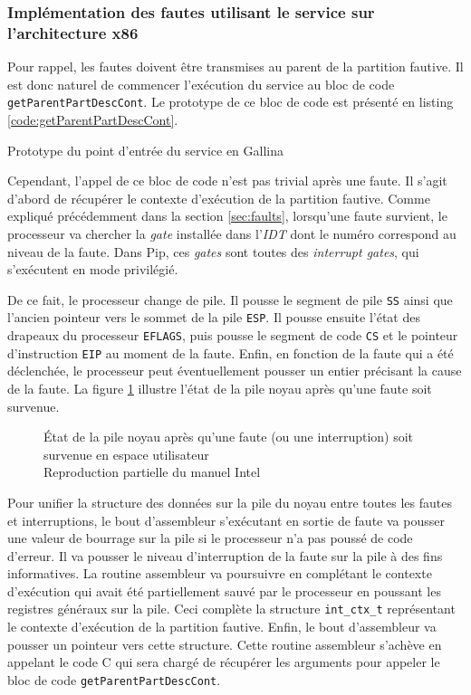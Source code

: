 		\subsubsection{Implémentation des fautes utilisant le service sur l'architecture x86}

		Pour rappel, les fautes doivent être transmises au parent de la partition fautive. Il est donc naturel de commencer l'exécution du service au bloc de code \texttt{getParentPartDescCont}. Le prototype de ce bloc de code est présenté en listing \ref{code:getParentPartDescCont}.

		\begin{listing}[!ht]
			\caption{Prototype du point d'entrée du service en Gallina}
			\label{code:getParentPartDescCont}
		\end{listing}

		Cependant, l'appel de ce bloc de code n'est pas trivial après une faute. Il s'agit d'abord de récupérer le contexte d'exécution de la partition fautive. Comme expliqué précédemment dans la section \ref{sec:faults}, lorsqu'une faute survient, le processeur va chercher la \emph{gate} installée dans l'\emph{IDT} dont le numéro correspond au niveau de la faute. Dans Pip, ces \emph{gates} sont toutes des \emph{interrupt gates}, qui s'exécutent en mode privilégié.

		De ce fait, le processeur change de pile. Il pousse le segment de pile \texttt{SS} ainsi que l'ancien pointeur vers le sommet de la pile \texttt{ESP}. Il pousse ensuite l'état des drapeaux du processeur \texttt{EFLAGS}, puis pousse le segment de code \texttt{CS} et le pointeur d'instruction \texttt{EIP} au moment de la faute. Enfin, en fonction de la faute qui a été déclenchée, le processeur peut éventuellement pousser un entier précisant la cause de la faute. La figure \ref{fig:proc_interrupt_stack} illustre l'état de la pile noyau après qu'une faute soit survenue.

		\begin{figure}[!ht]
			
			\caption{État de la pile noyau après qu'une faute (ou une interruption) soit survenue en espace utilisateur\\Reproduction partielle du manuel Intel \cite{intel_interrupt_stack}}
			\label{fig:proc_interrupt_stack}
		\end{figure}

		Pour unifier la structure des données sur la pile du noyau entre toutes les fautes et interruptions, le bout d'assembleur s'exécutant en sortie de faute va pousser une valeur de bourrage sur la pile si le processeur n'a pas poussé de code d'erreur. Il va pousser le niveau d'interruption de la faute sur la pile à des fins informatives. La routine assembleur va poursuivre en complétant le contexte d'exécution qui avait été partiellement sauvé par le processeur en poussant les registres généraux sur la pile. Ceci complète la structure \texttt{int\_ctx\_t} représentant le contexte d'exécution de la partition fautive. Enfin, le bout d'assembleur va pousser un pointeur vers cette structure. Cette routine assembleur s'achève en appelant le code C qui sera chargé de récupérer les arguments pour appeler le bloc de code \texttt{getParentPartDescCont}.

